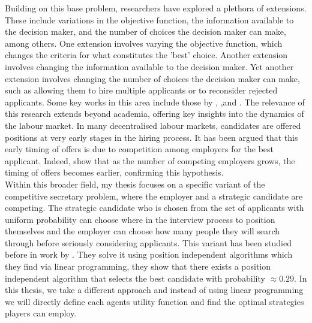 \documentclass{article}
\begin{document}
Building on this base problem, researchers have explored a plethora of extensions. These include variations in the objective function, the information available to the decision maker, and the number of choices the decision maker can make, among others. One extension involves varying the objective function, which changes the criteria for what constitutes the 'best' choice. Another extension involves changing the information available to the decision maker. Yet another extension involves changing the number of choices the decision maker can make, such as allowing them to hire multiple applicants or to reconsider rejected applicants. Some key works in this area include those by \cite{ajtai2001improved}, \cite{freeman1983secretary},and \cite{gilbert2006recognizing}. The relevance of this research extends beyond academia, offering key insights into the dynamics of the labour market. In many decentralised labour markets, candidates are offered positions at very early stages in the hiring process. It has been argued that this early timing of offers is due to competition among employers for the best applicant. Indeed, \cite{immorlica2006secretary} show that as the number of competing employers grows, the timing of offers becomes earlier, confirming this hypothesis.
\\[2ex]
Within this broader field, my thesis focuses on a specific variant of the competitive secretary problem, where the employer and a strategic candidate are competing. The strategic candidate who is chosen from the set of applicants with uniform probability can choose where in the interview process to position themselves and the employer can choose how many people they will search through before seriously considering applicants. This variant has been studied before in work by \cite{buchbinder2014secretary}. They solve it using position independent algorithms which they find via linear programming, they show that there exists a position independent algorithm that selects the best candidate with probability $\approx 0.29$. In this thesis, we take a different approach and instead of using linear programming we will directly define each agents utility function and find the optimal strategies players can employ.
\end{document}
